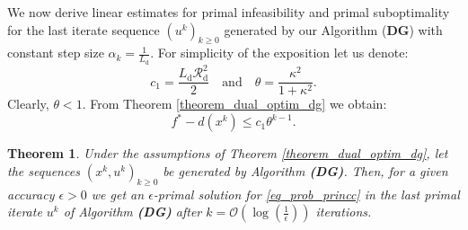 \documentclass{gOMS2e}
\theoremstyle{plain}
\newtheorem{theorem}{Theorem}[section]
\theoremstyle{definition}
\theoremstyle{remark}
\begin{document}
\noindent We now derive linear estimates for primal infeasibility and
primal suboptimality for the last iterate sequence $(u^k)_{k \geq
0}$ generated by our Algorithm ({\bf DG}) with constant step size
$\alpha_k = \frac{1}{L_\text{d}}$. For simplicity of the exposition
let us denote:
\[   c_1 = \frac{{L_{\mathrm{d}}} \mathcal{R}_\text{d}^2}{2} \quad \text{and}
\quad \theta=\frac{\kappa^2}{1+\kappa^2}. \]
Clearly, $\theta < 1$.  From Theorem \eqref{theorem_dual_optim_dg}
we obtain:
\begin{equation}
\label{conv_lineb} f^* - d({x}^{k}) \leq c_1 \theta^{k-1}.
\end{equation}

\begin{theorem}
\label{th_urndglast} Under the assumptions of Theorem \ref{theorem_dual_optim_dg},
let the sequences $\left(x^k, u^k\right)_{k\geq 0}$ be generated by
Algorithm {\bf (DG)}. Then, for a given accuracy $\epsilon>0$ we get
an $\epsilon$-primal solution for \eqref{eq_prob_princc} in the last primal
iterate $u^{k}$ of Algorithm \textbf{(DG)} after $k =
\mathcal{O}(\log(\frac{1}{\epsilon}))$ iterations.
\end{theorem}
\end{document}
